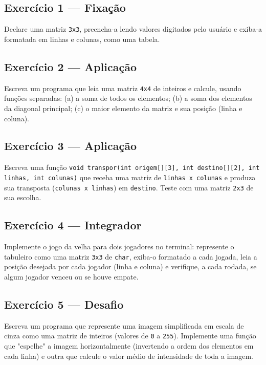 \begin{exercicio}

\subsection*{Exercício 1 --- Fixação}
Declare uma matriz \texttt{3x3}, preencha-a lendo valores digitados pelo usuário e exiba-a formatada em linhas e colunas, como uma tabela.

\subsection*{Exercício 2 --- Aplicação}
Escreva um programa que leia uma matriz \texttt{4x4} de inteiros e calcule, usando funções separadas: (a) a soma de todos os elementos; (b) a soma dos elementos da diagonal principal; (c) o maior elemento da matriz e sua posição (linha e coluna).

\subsection*{Exercício 3 --- Aplicação}
Escreva uma função \texttt{void transpor(int origem[][3], int destino[][2], int linhas, int colunas)} que receba uma matriz de \texttt{linhas x colunas} e produza sua transposta (\texttt{colunas x linhas}) em \texttt{destino}. Teste com uma matriz \texttt{2x3} de sua escolha.

\subsection*{Exercício 4 --- Integrador}
Implemente o jogo da velha para dois jogadores no terminal: represente o tabuleiro como uma matriz \texttt{3x3} de \texttt{char}, exiba-o formatado a cada jogada, leia a posição desejada por cada jogador (linha e coluna) e verifique, a cada rodada, se algum jogador venceu ou se houve empate.

\subsection*{Exercício 5 --- Desafio}
Escreva um programa que represente uma imagem simplificada em escala de cinza como uma matriz de inteiros (valores de \texttt{0} a \texttt{255}). Implemente uma função que "espelhe" a imagem horizontalmente (invertendo a ordem dos elementos em cada linha) e outra que calcule o valor médio de intensidade de toda a imagem.

\end{exercicio}
